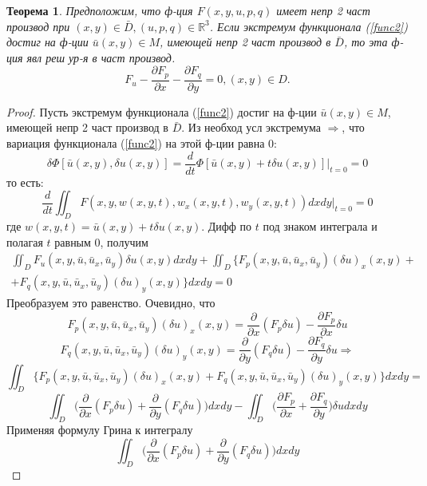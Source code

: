 \documentclass{article}
\newtheorem{theorem}{Теорема}[]
\begin{document}
\begin{theorem}
    Предположим, что ф-ция $F(x, y, u, p, q)$ имеет
    непр 2 част производ при $(x, y) \in \bar D, (u, p, q) \in \mathbb{R}^3$.
    Если экстремум функционала (\ref{func2}) достиг на ф-ции $\bar u(x, y) \in M$, имеющей непр 2 част производ в $\bar D$, то эта ф-ция явл реш ур-я в част производ.
    \begin{equation}
        F_u-\frac{\partial F_p}{\partial x}-\frac{\partial F_q}{\partial y}=0, (x,y)\in D.
        \label{resh1}
    \end{equation}
    
\end{theorem}
\begin{proof}
    Пусть экстремум функционала (\ref{func2}) достиг на ф-ции $\bar u(x, y) \in M$, имеющей непр 2 част производ в $\bar D$. Из необход усл экстремума $\Longrightarrow$, что вариация
    функционала (\ref{func2}) на этой ф-ции равна 0:
    $$\delta \Phi[\bar u(x,y), \delta u(x,y)]=\frac{d}{dt}\Phi[\bar u(x,y)+t\delta u(x,y)]\Big|_{t=0}=0$$ то есть:
    $$\frac{d}{dt} \iint_D F(x, y, w(x, y, t), w_x(x, y, t), w_y(x, y, t))dxdy\Big|_{t=0}=0$$   
    где $w(x, y, t) = \bar u(x, y) + t\delta u(x, y)$. Дифф по $t$ под знаком интеграла и полагая $t$ равным 0, получим
    \begin{equation}
    \begin{gathered}
        \iint_D F_u(x, y, \bar u, \bar u_x, \bar u_y)\delta u(x, y)dxdy+\iint_D \Big\{F_p(x, y, \bar u, \bar u_x, \bar u_y)(\delta u)_x(x, y)+\\
        +F_q(x, y,\bar u,\bar u_x, \bar u_y)(\delta u)_y(x, y)\Big\}dxdy=0        
    \end{gathered}
        \label{dd}
    \end{equation}
    Преобразуем это равенство. Очевидно, что
    $$F_p(x, y, \bar u, \bar u_x, \bar u_y)(\delta u)_x(x, y)=\frac{\partial}{\partial x}
    (F_p\delta u) - \frac{\partial F_p}{\partial x}\delta u$$
    $$F_q(x, y, \bar u, \bar u_x, \bar u_y)(\delta u)_y(x, y)=\frac{\partial}{\partial y}
    (F_q\delta u) - \frac{\partial F_q}{\partial y}\delta u \Longrightarrow$$
    $$\iint_D \Big\{ F_p(x,y,\bar u, \bar u_x, \bar u_y)(\delta u)_x(x, y)+F_q(x,y,\bar u, \bar u_x, \bar u_y)(\delta u)_y(x, y)\Big\}dxdy=$$
    $$\iint_D \Big( \frac{\partial}{\partial x}(F_p\delta u) + \frac{\partial}{\partial y}(F_q\delta u)\Big)dxdy-\iint_D \Big( \frac{\partial F_p}{\partial x}+\frac{\partial F_q}{\partial y}\Big)\delta u dxdy$$
    Применяя формулу Грина к интегралу
    $$\iint_D \Big( \frac{\partial}{\partial x}(F_p\delta u) + \frac{\partial}{\partial y}(F_q\delta u)\Big)dxdy$$

\end{proof}
\end{document}
